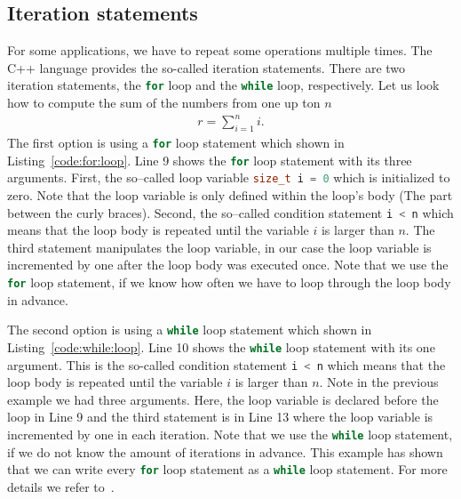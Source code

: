 \subsection{Iteration statements}
\label{sec:iteration:statements}
 For some applications, we have to repeat some operations multiple times. The C++ language provides the so-called iteration statements. There are two iteration statements, the \lstinline[language=C++]|for| loop and the \lstinline[language=C++]|while| loop, respectively. Let us look how to compute the sum of the numbers from one up ton $n$
\begin{align}
r = \sum\limits_{i=1}^n i\text{.}
\end{align}
The first option is using a \lstinline[language=C++]|for| loop statement which shown in Listing~\ref{code:for:loop}. Line 9 shows the \lstinline[language=C++]|for| loop statement with its three arguments. First, the so--called loop variable \lstinline[language=C++]{size_t i = 0} which is initialized to zero. Note that the loop variable is only defined within the loop's body (The part between the curly braces). Second, the so--called condition statement \lstinline[language=C++]{i < n} which means that the loop body is repeated until the variable $i$ is larger than $n$. The third statement manipulates the loop variable, in our case the loop variable is incremented by one after the loop body was executed once. Note that we use the \lstinline[language=C++]|for| loop statement, if we know how often we have to loop through the loop body in advance.




The second option is using a \lstinline[language=C++]|while| loop statement which shown in Listing~\ref{code:while:loop}. Line 10 shows the \lstinline[language=C++]|while| loop statement with its one argument. This is the so-called condition statement  \lstinline[language=C++]{i < n} which means that the loop body is repeated until the variable $i$ is larger than $n$. Note in the previous example we had three arguments. Here, the loop variable is declared before the loop in Line 9 and the third statement is  in Line 13 where the loop variable is incremented by one in each iteration. Note that we use the \lstinline[language=C++]|while| loop statement, if we do not know the amount of iterations in advance. This example has shown that we can write every \lstinline[language=C++]|for| loop statement as a \lstinline[language=C++]|while| loop statement. For more details we refer to~\cite[Chapter~2]{andrew2000accelerated}.   


